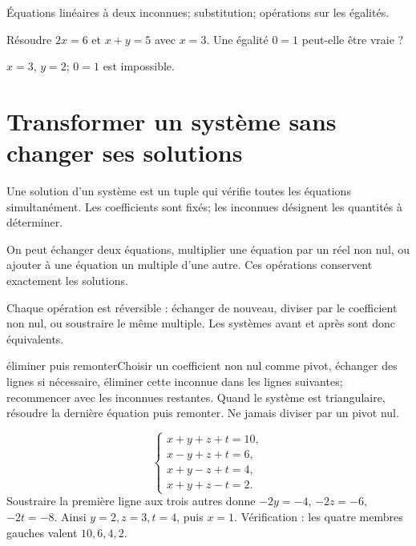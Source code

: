 \label{t11s-c09}
\begin{revision}Équations linéaires à deux inconnues; substitution; opérations sur les égalités.\end{revision}
\begin{automatismes}\exo\label{t11s-c09-auto}Résoudre $2x=6$ et $x+y=5$ avec $x=3$. Une égalité $0=1$ peut-elle être vraie ?\end{automatismes}
\begin{corrige}\label{sol-t11s-c09-auto}$x=3$, $y=2$; $0=1$ est impossible.\end{corrige}

\section{Transformer un système sans changer ses solutions}
\begin{definition}Une solution d’un système est un tuple qui vérifie toutes les équations simultanément. Les coefficients sont fixés; les inconnues désignent les quantités à déterminer.\end{definition}
\begin{propriete}On peut échanger deux équations, multiplier une équation par un réel non nul, ou ajouter à une équation un multiple d’une autre. Ces opérations conservent exactement les solutions.\end{propriete}
\begin{demonstration}Chaque opération est réversible : échanger de nouveau, diviser par le coefficient non nul, ou soustraire le même multiple. Les systèmes avant et après sont donc équivalents.\end{demonstration}
\begin{methode}{éliminer puis remonter}Choisir un coefficient non nul comme pivot, échanger des lignes si nécessaire, éliminer cette inconnue dans les lignes suivantes; recommencer avec les inconnues restantes. Quand le système est triangulaire, résoudre la dernière équation puis remonter. Ne jamais diviser par un pivot nul.\end{methode}
\begin{exemple}
\[
\begin{cases}
x+y+z+t=10,\\x-y+z+t=6,\\x+y-z+t=4,\\x+y+z-t=2.
\end{cases}
\]
Soustraire la première ligne aux trois autres donne $-2y=-4$, $-2z=-6$, $-2t=-8$. Ainsi $y=2,z=3,t=4$, puis $x=1$. Vérification : les quatre membres gauches valent $10,6,4,2$.
\end{exemple}
